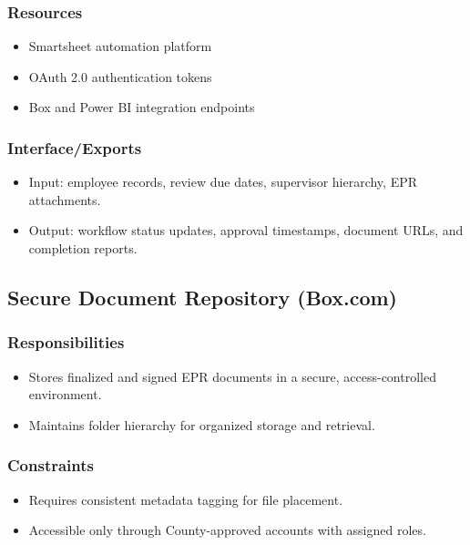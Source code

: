 \documentclass[12pt]{article}
\def\textbf#1{#1}%
\begin{document}
\subsubsection{Resources}
\begin{itemize}[nosep]
  \item Smartsheet automation platform
  \item OAuth 2.0 authentication tokens
  \item Box and Power BI integration endpoints
\end{itemize}

\subsubsection{Interface/Exports}
\begin{itemize}[nosep]
  \item \textbf{Input:} employee records, review due dates, supervisor hierarchy, EPR attachments.
  \item \textbf{Output:} workflow status updates, approval timestamps, document URLs, and completion reports.
\end{itemize}

\subsection{Secure Document Repository (Box.com)}
\subsubsection{Responsibilities}
\begin{itemize}[nosep]
  \item Stores finalized and signed EPR documents in a secure, access-controlled environment.
  \item Maintains folder hierarchy for organized storage and retrieval.
\end{itemize}

\subsubsection{Constraints}
\begin{itemize}[nosep]
  \item Requires consistent metadata tagging for file placement.
  \item Accessible only through County-approved accounts with assigned roles.
\end{itemize}
\end{document}
